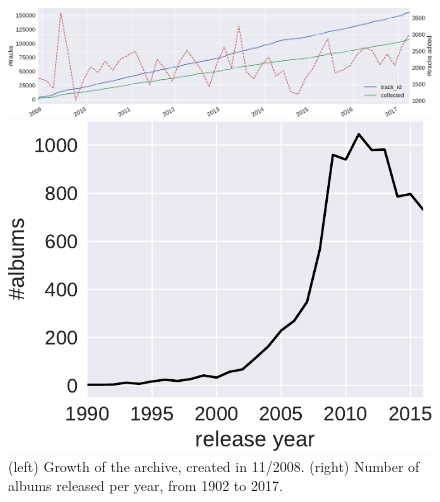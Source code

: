 \documentclass{article}
\begin{document}
\begin{figure}
	\begin{minipage}{0.74\linewidth}
		\centering
		\includegraphics[width=\linewidth]{growth.pdf}
	\end{minipage} \hfill
	\begin{minipage}{0.24\linewidth}
		\centering
		\includegraphics[width=\linewidth]{album_release_year.pdf}
	\end{minipage}
	\caption{(left) Growth of the archive, created in 11/2008. (right) Number of albums released per year, from 1902 to 2017.}
	\label{fig:growth}
	\label{fig:album_release_year}
\end{figure}
\end{document}
